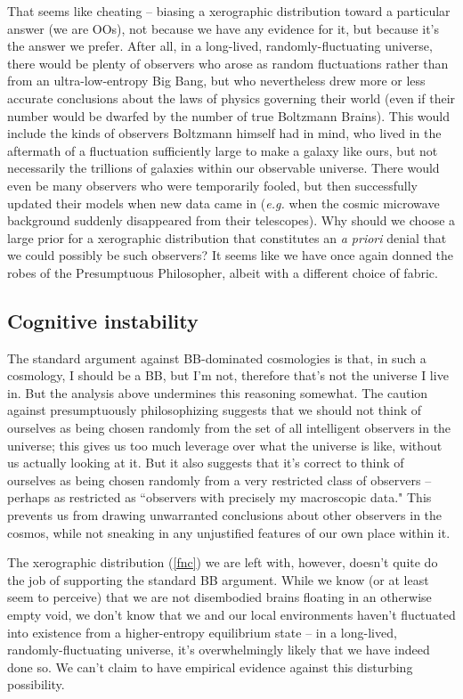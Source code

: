 \documentclass[12pt,letterpaper]{article}
\begin{document}
That seems like cheating -- biasing a xerographic distribution toward a particular answer (we are OOs), not because we have any evidence for it, but because it's the answer we prefer.
After all, in a long-lived, randomly-fluctuating universe, there would be plenty of observers who arose as random fluctuations rather than from an ultra-low-entropy Big Bang, but who nevertheless drew more or less accurate conclusions about the laws of physics governing their world (even if their number would be dwarfed by the number of true Boltzmann Brains).
This would include the kinds of observers Boltzmann himself had in mind, who lived in the aftermath of a fluctuation sufficiently large to make a galaxy like ours, but not necessarily the trillions of galaxies within our observable universe.
There would even be many observers who were temporarily fooled, but then successfully updated their models when new data came in (\emph{e.g.} when the cosmic microwave background suddenly disappeared from their telescopes).
Why should we choose a large prior for a xerographic distribution that constitutes an \emph{a priori} denial that we could possibly be such observers?
It seems like we have once again donned the robes of the Presumptuous Philosopher, albeit with a different choice of fabric.


\subsection{Cognitive instability}

The standard argument against BB-dominated cosmologies is that, in such a cosmology, I should be a BB, but I'm not, therefore that's not the universe I live in.
But the analysis above undermines this reasoning somewhat.
The caution against presumptuously philosophizing suggests that we should not think of ourselves as being chosen randomly from the set of all intelligent observers in the universe; this gives us too much leverage over what the universe is like, without us actually looking at it.
But it also suggests that it's correct to think of ourselves as being chosen randomly from a very restricted class of observers -- perhaps as restricted as ``observers with precisely my macroscopic data."
This prevents us from drawing unwarranted conclusions about other observers in the cosmos, while not sneaking in any unjustified features of our own place within it.

The xerographic distribution (\ref{fnc}) we are left with, however, doesn't quite do the job of supporting the standard BB argument.
While we know (or at least seem to perceive) that we are not disembodied brains floating in an otherwise empty void, we don't know that we and our local environments haven't fluctuated into existence from a higher-entropy equilibrium state -- in a long-lived, randomly-fluctuating universe, it's overwhelmingly likely that we have indeed done so.
We can't claim to have empirical evidence against this disturbing possibility.
\end{document}
